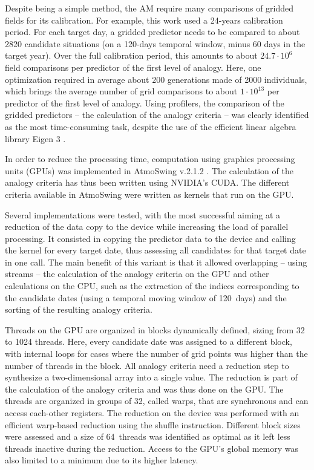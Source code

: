 \documentclass[draft]{agujournal2019}
\begin{document}
Despite being a simple method, the AM require many comparisons of gridded fields for its calibration. For example, this work used a 24-years calibration period. For each target day, a gridded predictor needs to be compared to about 2820 candidate situations (on a 120-days temporal window, minus 60 days in the target year). Over the full calibration period, this amounts to about $24.7\cdot10^6$ field comparisons per predictor of the first level of analogy. Here, one optimization required in average about 200 generations made of 2000 individuals, which brings the average number of grid comparisons to about $1\cdot10^{13}$ per predictor of the first level of analogy. Using profilers, the comparison of the gridded predictors -- the calculation of the analogy criteria -- was clearly identified as the most time-consuming task, despite the use of the efficient linear algebra library Eigen 3 \cite{Guennebaud2010}.

In order to reduce the processing time, computation using graphics processing units (GPUs) was implemented in AtmoSwing v.2.1.2 \cite{Horton2019b}. The calculation of the analogy criteria has thus been written using NVIDIA's CUDA. The different criteria available in AtmoSwing were written as kernels that run on the GPU.

Several implementations were tested, with the most successful aiming at a reduction of the data copy to the device while increasing the load of parallel processing. It consisted in copying the predictor data to the device and calling the kernel for every target date, thus assessing all candidates for that target date in one call. The main benefit of this variant is that it allowed overlapping -- using streams -- the calculation of the analogy criteria on the GPU and other calculations on the CPU, such as the extraction of the indices corresponding to the candidate dates (using a temporal moving window of 120~days) and the sorting of the resulting analogy criteria.

Threads on the GPU are organized in blocks dynamically defined, sizing from 32 to 1024 threads. Here, every candidate date was assigned to a different block, with internal loops for cases where the number of grid points was higher than the number of threads in the block. All analogy criteria need a reduction step to synthesize a two-dimensional array into a single value. The reduction is part of the calculation of the analogy criteria and was thus done on the GPU. The threads are organized in groups of 32, called warps, that are synchronous and can access each-other registers. The reduction on the device was performed with an efficient warp-based reduction using the shuffle instruction. Different block sizes were assessed and a size of 64~threads was identified as optimal as it left less threads inactive during the reduction. Access to the GPU's global memory was also limited to a minimum due to its higher latency.
\end{document}
